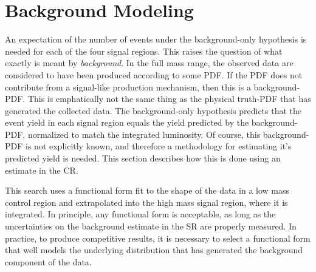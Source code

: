 \section{Background Modeling}\label{sec:ciBkg}

An expectation of the number of events under the background-only hypothesis is needed for each of the four signal regions.
This raises the question of what exactly is meant by \emph{background}.
In the full mass range, the observed data are considered to have been produced according to some PDF.
If the PDF does not contribute from a signal-like production mechanism, then this is a background-PDF.
This is emphatically not the same thing as the physical truth-PDF that has generated the collected data.
The background-only hypothesis predicts that the event yield in each signal region equals the yield predicted by the background-PDF, normalized to match the integrated luminosity.
Of course, this background-PDF is not explicitly known, and therefore a methodology for estimating it's predicted yield is needed.
This section describes how this is done using an estimate in the CR.

This search uses a functional form fit to the shape of the data in a low mass control region and extrapolated into the high mass signal region, where it is integrated.
In principle, any functional form is acceptable, as long as the uncertainties on the background estimate in the SR are properly measured.
In practice, to produce competitive results, it is necessary to select a functional form that well models the underlying distribution that has generated the background component of the data.

